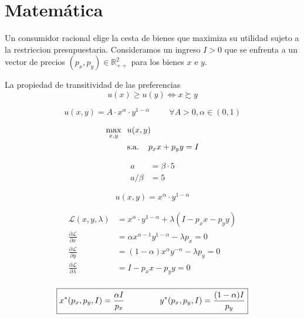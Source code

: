 \documentclass[a4paper,12pt]{article}
\newcommand{\der}[2]{\frac{\partial #1}{\partial #2}}
\begin{document}
\section{Matemática}

Un consumidor racional elige la cesta de bienes que maximiza su utilidad sujeto a la restriccion presupuestaria. Consideramos un ingreso $I>0$ que se enfrenta a un vector de precios $(p_x,p_y) \in \mathbb{R}^2_{++}$ para los bienes $x$ e $y$.

\vspace{0.5cm}

La propiedad de transitividad de las preferencias $$u(x) \geq u(y) \iff x \succsim y$$

$$u(x,y)=A\cdot x^\alpha \cdot y^{1-\alpha} \hspace{1cm} \forall A>0, \alpha \in (0,1)$$

\vspace{-1cm}

\begin{align*}
    \max_{x,y} \hspace{0.25cm} & u(x,y) \\
    & \text{s.a. } \hspace{0.25cm} p_xx+p_yy = I
\end{align*}

\vspace{-1cm}

\begin{align*}
    a & = \beta\cdot 5 \\
    a/\beta & = 5
\end{align*}


$$u(x,y)= x^\alpha \cdot y^{1-\alpha}$$

\vspace{-1cm}

\begin{align*}
    \mathcal{L}(x,y,\lambda) & = x^\alpha \cdot y^{1-\alpha} + \lambda(I-p_xx-p_yy)\\
    \der{\mathcal{L}}{x} & = \alpha x^{\alpha-1}y^{1-\alpha} - \lambda p_x =0\\
    \der{\mathcal{L}}{y} & = (1-\alpha) x^{\alpha}y^{-\alpha} - \lambda p_y=0 \\
    \der{\mathcal{L}}{\lambda } & = I-p_xx-p_yy=0 \\
\end{align*}

\begin{equation}
    \boxed{
        x^*(p_x,p_y,I)=\frac{\alpha I}{p_x} \hspace{1.5cm}y^*(p_x,p_y,I)=\frac{(1-\alpha)I}{p_y}
    }
\end{equation}
\end{document}
